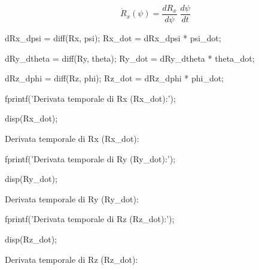 \documentclass[11pt, a4paper]{article}
\begin{document}
\[
    {\dot{R} }_x (\psi )=\frac{dR_x }{d\psi }\;\frac{d\psi }{dt}
\]
\begin{matlabcode}
dRx_dpsi = diff(Rx, psi);
Rx_dot = dRx_dpsi * psi_dot;

dRy_dtheta = diff(Ry, theta);
Ry_dot = dRy_dtheta * theta_dot;

dRz_dphi = diff(Rz, phi);
Rz_dot = dRz_dphi * phi_dot;

fprintf('Derivata temporale di Rx (Rx_dot):');

disp(Rx_dot);
\end{matlabcode}
\begin{matlaboutput}
Derivata temporale di Rx (Rx_dot):
\end{matlaboutput}
\begin{matlabcode}
fprintf('Derivata temporale di Ry (Ry_dot):');

disp(Ry_dot);
\end{matlabcode}
\begin{matlaboutput}
Derivata temporale di Ry (Ry_dot):
\end{matlaboutput}
\begin{matlabcode}
fprintf('Derivata temporale di Rz (Rz_dot):');

disp(Rz_dot);
\end{matlabcode}
\begin{matlaboutput}
Derivata temporale di Rz (Rz_dot):
\end{matlaboutput}
\end{document}
